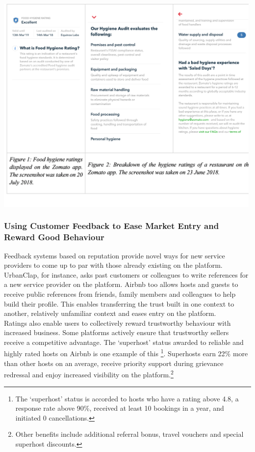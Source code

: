\documentclass[a4paper, 12pt]{article}
\begin{document}
\includegraphics[height = 4.3in]{fig1 and fi2.png}

	\subsubsection{Using Customer Feedback to Ease Market Entry and Reward Good Behaviour}
                    
 Feedback systems based on reputation provide novel ways for new service providers to come up to par with those already existing on the platform. UrbanClap, for instance, asks past customers or colleagues to write references for a new service provider on the platform. Airbnb too allows hosts and guests to receive public references from friends, family members and colleagues to help build their profile. This enables transferring the trust built in one context to another, relatively unfamiliar context and eases entry on the platform.\\
                    
                 Ratings also enable users to collectively reward trustworthy behaviour with increased business. Some platforms actively ensure that trustworthy sellers receive a competitive advantage. The ‘superhost’ status awarded to reliable and highly rated hosts on Airbnb is one example of this \footnote{The ‘superhost’ status is accorded to hosts who have a rating above 4.8, a response rate above 90\%, received at least 10 bookings in a year, and initiated 0 cancellations.}.  Superhosts earn 22\% more than other hosts on an average, receive priority support during grievance redressal and enjoy increased visibility on the platform.\footnote{Other benefits include additional referral bonus, travel vouchers and special superhost discounts.}   \\
\end{document}
